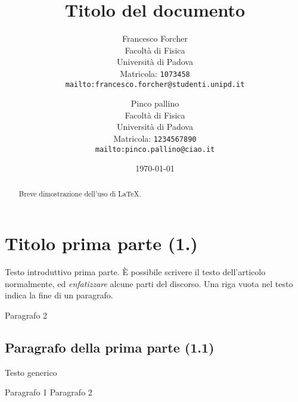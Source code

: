 \documentclass[12pt]{article} %
\title{Titolo del documento}
\author{Francesco Forcher\\ %
Facoltà di Fisica\\
Università di Padova\\
Matricola: \texttt{1073458}\\
\texttt{mailto:francesco.forcher@studenti.unipd.it}
\and
Pinco pallino\\ %
Facoltà di Fisica\\
Università di Padova\\
Matricola: \texttt{1234567890}\\
\texttt{mailto:pinco.pallino@ciao.it}\\
}
\date{\today}
\begin{document}
\maketitle %
\tableofcontents %


\begin{abstract} %
	Breve dimostrazione dell'uso di \LaTeX.
\end{abstract}


\section{Titolo prima parte (1.)}
	Testo introduttivo prima parte.
	È possibile scrivere il testo dell'articolo normalmente, ed \emph{enfatizzare} alcune parti del discorso. %
	Una riga vuota nel testo indica la fine di un paragrafo.
 
	Paragrafo 2


\subsection{Paragrafo della prima parte (1.1)}
	Testo generico

	Paragrafo 1
	\linebreak[4] %
	Paragrafo 2
\end{document}
